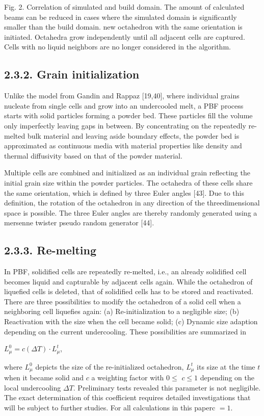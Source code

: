 \documentclass[10pt]{article}
\begin{document}
Fig. 2. Correlation of simulated and build domain. The amount of calculated beams can be reduced in cases where the simulated domain is significantly smaller than the build domain. new octahedron with the same orientation is initiated. Octahedra grow independently until all adjacent cells are captured. Cells with no liquid neighbors are no longer considered in the algorithm.

\subsection*{2.3.2. Grain initialization}
Unlike the model from Gandin and Rappaz [19,40], where individual grains nucleate from single cells and grow into an undercooled melt, a PBF process starts with solid particles forming a powder bed. These particles fill the volume only imperfectly leaving gaps in between. By concentrating on the repeatedly re-melted bulk material and leaving aside boundary effects, the powder bed is approximated as continuous media with material properties like density and thermal diffusivity based on that of the powder material.

Multiple cells are combined and initialized as an individual grain reflecting the initial grain size within the powder particles. The octahedra of these cells share the same orientation, which is defined by three Euler angles [43]. Due to this definition, the rotation of the octahedron in any direction of the threedimensional space is possible. The three Euler angles are thereby randomly generated using a mersenne twister pseudo random generator [44].

\subsection*{2.3.3. Re-melting}
In PBF, solidified cells are repeatedly re-melted, i.e., an already solidified cell becomes liquid and capturable by adjacent cells again. While the octahedron of liquefied cells is deleted, that of solidified cells has to be stored and reactivated. There are three possibilities to modify the octahedron of a solid cell when a neighboring cell liquefies again: (a) Re-initialization to a negligible size; (b) Reactivation with the size when the cell became solid; (c) Dynamic size adaption depending on the current undercooling. These possibilities are summarized in

$L_{\mu}^{0}=c(\Delta T) \cdot L_{\mu}^{t}$,

where $L_{\mu}^{0}$ depicts the size of the re-initialized octahedron, $L_{\mu}^{t}$ its size at the time $t$ when it became solid and $c$ a weighting factor with $0 \leq$ $c \leq 1$ depending on the local undercooling $\Delta T$. Preliminary tests revealed this parameter is not negligible. The exact determination of this coefficient requires detailed investigations that will be subject to further studies. For all calculations in this paperc $=1$.
\end{document}
